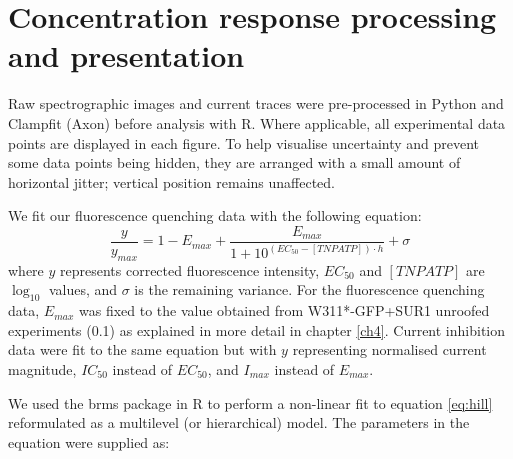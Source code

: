 \section{Concentration response processing and presentation}
Raw spectrographic images and current traces were pre-processed in Python and Clampfit (Axon) before analysis with R.
Where applicable, all experimental data points are displayed in each figure.
To help visualise uncertainty and prevent some data points being hidden, they are arranged with a small amount of horizontal jitter; vertical position remains unaffected.

We fit our fluorescence quenching data with the following equation:
\begin{equation} \label{eq:hill}
    \frac{y}{y_{max}} = 1 - E_{max} + \frac{E_{max}}{1 + 10^{(EC_{50} - [TNPATP]) \cdot h}} + \sigma
\end{equation}
where $y$ represents corrected fluorescence intensity, $EC_{50}$ and $[TNPATP]$ are $\log_{10}$ values, and $\sigma$ is the remaining variance.
For the fluorescence quenching data, $E_{max}$ was fixed to the value obtained from W311*-GFP+SUR1 unroofed experiments (0.1) as explained in more detail in chapter \ref{ch4}.
Current inhibition data were fit to the same equation but with $y$ representing normalised current magnitude, $IC_{50}$ instead of $EC_{50}$, and $I_{max}$ instead of $E_{max}$.

We used the brms package in R to perform a non-linear fit to equation \ref{eq:hill} reformulated as a multilevel (or hierarchical) model.
The parameters in the equation were supplied as:

